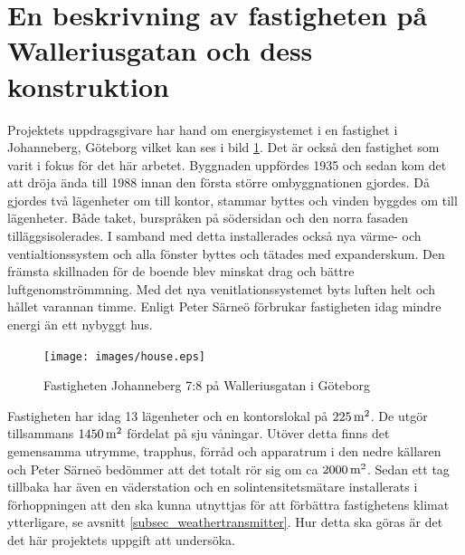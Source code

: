 \section{En beskrivning av fastigheten på Walleriusgatan och dess konstruktion}
\label{subsec:thehouse}




Projektets uppdragsgivare har hand om energisystemet i en fastighet i Johanneberg, Göteborg vilket kan ses i bild \ref{fig:thehouse:house}.
Det är också den fastighet som varit i fokus för det här arbetet. Byggnaden uppfördes 1935\cite{ritningar_urspr} och sedan kom det att dröja ända till 1988 innan den första större ombyggnationen gjordes. Då gjordes två lägenheter om till kontor, stammar byttes och vinden byggdes om till lägenheter. Både taket, burspråken på södersidan och den norra fasaden tilläggsisolerades. I samband med detta installerades också nya värme- och ventialtionssystem och alla fönster byttes och tätades med expanderskum. Den främsta skillnaden för de boende blev minskat drag och bättre luftgenomströmmning.  Med det nya venitlationssystemet byts luften helt och hållet varannan timme. Enligt Peter Särneö\cite{petersarneo} förbrukar fastigheten idag mindre energi än ett nybyggt hus.

\begin{figure}
\centering
\texttt{[image: images/house.eps]}
\caption{Fastigheten Johanneberg 7:8 på Walleriusgatan i Göteborg}
\label{fig:thehouse:house}
\end{figure}

Fastigheten har idag 13 lägenheter och en kontorslokal på $\unit[225]{m^2}$. De utgör tillsammans $\unit[1450]{m^2}$ fördelat på sju våningar. Utöver detta finns det gemensamma utrymme, trapphus, förråd och apparatrum i den nedre källaren och Peter Särneö\cite{petersarneo} bedömmer att det totalt rör sig om ca $\unit[2000]{m^2}$. Sedan ett tag tillbaka har även en väderstation och en solintensitetsmätare installerats i förhoppningen att den ska kunna utnyttjas för att förbättra fastighetens klimat ytterligare, se avsnitt \ref{subsec_weathertransmitter}. Hur detta ska göras är det det här projektets uppgift att undersöka.

